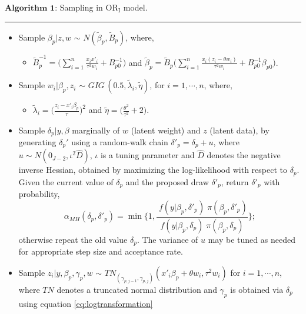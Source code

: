 \(\textbf{Algorithm~1}\): Sampling in \(\mathrm{OR_{I}}\) model.

\noindent

\rule{\textwidth}{0.5pt}

\begin{itemize}
\tightlist
\item
  Sample \(\beta_{p}| z,w\) \(\sim\) \(N(\tilde{\beta}_{p}, \tilde{B}_{p})\), where,

  \begin{itemize}
  \tightlist
  \item
    \(\tilde{B}^{-1}_{p} = \bigg(\sum_{i=1}^{n} \frac{x_{i} x'_{i}}{\tau^{2} w_{i}} + B_{p0}^{-1} \bigg)\) \hspace{0.05in} and \hspace{0.05in} \(\tilde{\beta}_{p} = \tilde{B}_{p} \bigg(\sum_{i=1}^{n} \frac{x_{i}(z_{i} - \theta w_{i})}{\tau^{2} w_{i}} + B_{p0}^{-1} \beta_{p0} \bigg)\).
  \end{itemize}
\item
  Sample \(w_{i}|\beta_{p}, z_{i}\) \(\sim\) \(GIG\, (0.5, \tilde{\lambda}_{i}, \tilde{\eta})\), for \(i=1,\cdots,n\), where,

  \begin{itemize}
  \tightlist
  \item
    \(\tilde{\lambda}_{i} = \bigg(\frac{z_{i} - x'_{i}\beta_{p}}{\tau} \bigg)^{2}\) \hspace{0.05in} and \hspace{0.05in} \(\tilde{\eta} = \Big(\frac{\theta^{2}}{\tau^{2}} + 2 \Big)\).
  \end{itemize}
\item
  Sample \(\delta_{p}|y, \beta\) marginally of \(w\) (latent weight) and \(z\) (latent data), by generating \(\delta_{p}'\) using a random-walk chain \(\delta'_{p} = \delta_{p} + u\), where \(u \sim N(0_{J-2},\iota^{2} \hat{D})\), \(\iota\) is a tuning parameter and \(\hat{D}\) denotes the negative inverse Hessian, obtained by maximizing the log-likelihood with respect to \(\delta_{p}\). Given the current value of \(\delta_{p}\) and the proposed draw \(\delta'_{p}\), return \(\delta'_{p}\) with probability,
  \begin{equation*}
      \alpha_{MH}(\delta_{p}, \delta'_{p}) = \min \bigg\{1,\frac{ \;f(y|\beta_{p},\delta'_{p}) \;\pi(\beta_{p}, \delta'_{p})}{f(y|\beta_{p},\delta_{p}) \;\pi(\beta_{p}, \delta_{p})}\bigg\};
  \end{equation*}
  otherwise repeat the old value \(\delta_{p}\). The variance of \(u\) may be tuned as needed for appropriate step size and acceptance rate.
\item
  Sample \(z_{i}|y, \beta_{p}, \gamma_{p},w\) \(\sim\) \(TN_{(\gamma_{p, j-1}, \gamma_{p, j})}(x'_{i}\beta_{p} + \theta w_{i}, \tau^{2}w_{i})\) for \(i=1,\cdots,n\), where \(TN\) denotes a truncated normal distribution and \(\gamma_{p}\) is obtained via \(\delta_{p}\) using equation \eqref{eq:logtransformation}
\end{itemize}

